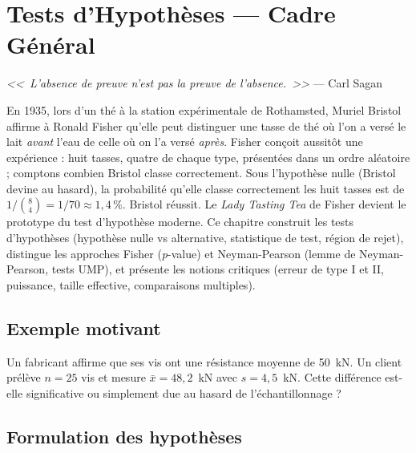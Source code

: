 \chapter{Tests d'Hypoth\`eses --- Cadre G\'en\'eral}
\label{ch:tests}

\begin{center}
\textit{<<~L'absence de preuve n'est pas la preuve de l'absence.~>>} --- Carl Sagan
\end{center}

En 1935, lors d'un thé à la station expérimentale de Rothamsted, Muriel Bristol affirme à Ronald Fisher qu'elle peut distinguer une tasse de thé où l'on a versé le lait \emph{avant} l'eau de celle où on l'a versé \emph{après}. Fisher conçoit aussitôt une expérience : huit tasses, quatre de chaque type, présentées dans un ordre aléatoire ; comptons combien Bristol classe correctement. Sous l'hypothèse nulle (Bristol devine au hasard), la probabilité qu'elle classe correctement les huit tasses est de $1/\binom{8}{4} = 1/70 \approx 1,4\,\%$. Bristol réussit. Le \emph{Lady Tasting Tea} de Fisher devient le prototype du test d'hypothèse moderne. Ce chapitre construit les tests d'hypothèses (hypothèse nulle vs alternative, statistique de test, région de rejet), distingue les approches Fisher (\emph{p}-value) et Neyman-Pearson (lemme de Neyman-Pearson, tests UMP), et présente les notions critiques (erreur de type I et II, puissance, taille effective, comparaisons multiples).

\section{Exemple motivant}

Un fabricant affirme que ses vis ont une r\'esistance moyenne de 50~kN. Un client pr\'el\`eve $n=25$ vis et mesure $\bar{x}=48{,}2$~kN avec $s=4{,}5$~kN. Cette diff\'erence est-elle significative ou simplement due au hasard de l'\'echantillonnage ?

\section{Formulation des hypoth\`eses}

